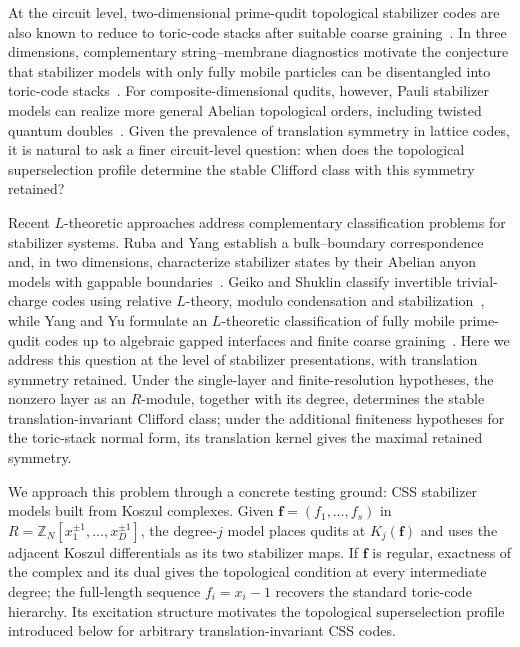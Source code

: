 \documentclass[aps,prx,english,superscriptaddress,twocolumn,tightenlines,showpacs,longbibliography,floatfix,amsfonts]{revtex4-2}
\theoremstyle{remark}
\theoremstyle{definition}
\begin{document}
	At the circuit level, two-dimensional prime-qudit
		topological stabilizer codes are also known to reduce to toric-code stacks
		after suitable coarse graining~\cite{Bombin2012Universal,
		Bombin2014Structure,Haah2016Algebraic,Haah2021Classification}. In three
		dimensions, complementary string--membrane diagnostics motivate the
		conjecture that stabilizer models with only fully mobile particles can be
		disentangled into toric-code stacks~\cite{Dua2019Sorting}. For
		composite-dimensional qudits, however, Pauli stabilizer models can realize
	more general Abelian topological orders, including twisted quantum
		doubles~\cite{Ellison2022TwistedQuantumDoubles}. Given the prevalence of
		translation symmetry in lattice codes, it is natural to ask a finer
		circuit-level question: when does the topological superselection profile
		determine the stable Clifford class with this symmetry retained?

	Recent \(L\)-theoretic approaches address complementary classification
	problems for stabilizer systems. Ruba and Yang establish a bulk--boundary
	correspondence and, in two dimensions, characterize stabilizer states by
	their Abelian anyon models with gappable
	boundaries~\cite{RubaYang2025Witt}. Geiko and Shuklin classify invertible
	trivial-charge codes using relative \(L\)-theory, modulo condensation and
	stabilization~\cite{GeikoShuklin2025Invertible}, while Yang and Yu formulate
		an \(L\)-theoretic classification of fully mobile prime-qudit codes up to
		algebraic gapped interfaces and finite coarse
	graining~\cite{YangYu2026Classification}. Here we address this question at the
	level of stabilizer presentations, with translation symmetry retained. Under
	the single-layer and finite-resolution hypotheses, the nonzero layer as an
	\(R\)-module, together with its degree, determines the stable
	translation-invariant Clifford class; under the additional finiteness
	hypotheses for the toric-stack normal form, its translation kernel gives the
	maximal retained symmetry.

	We approach this problem through a concrete testing ground: CSS stabilizer
	models built from Koszul complexes. Given \(\mathbf f=(f_1,\ldots,f_s)\) in
	\(R=\mathbb Z_N[x_1^{\pm1},\ldots,x_D^{\pm1}]\), the degree-\(j\) model
	places qudits at \(K_j(\mathbf f)\) and uses the adjacent Koszul differentials
	as its two stabilizer maps. If \(\mathbf f\) is regular, exactness of the
	complex and its dual gives the topological condition at every intermediate
	degree; the full-length sequence \(f_i=x_i-1\) recovers the standard
	toric-code hierarchy. Its excitation structure motivates the topological
	superselection profile introduced below for arbitrary translation-invariant
	CSS codes.
\end{document}
